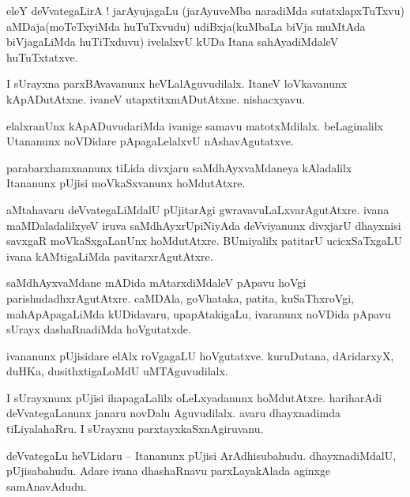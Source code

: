 \documentclass{article}
\begin{document}
\begin{mng}%
eleY deVvategaLirA ! jarAyujagaLu (jarAyuveMba naradiMda sutatxlapxTuTxvu) aMDaja(moTeTxyiMda 
huTuTxvudu) udiBxja(kuMbaLa biVja muMtAda biVjagaLiMda huTiTxduvu) ivelalxvU kUDa Itana 
sahAyadiMdaleV huTuTxtatxve.
\end{mng}

\begin{mng}%
I sUrayxna parxBAvavanunx heVLalAguvudilalx. ItaneV loVkavanunx kApADutAtxne. ivaneV 
utapxtitxmADutAtxne. nishacxyavu.
\end{mng}

\begin{mng}%
elalxranUnx kApADuvudariMda ivanige samavu matotxMdilalx. beLaginalilx Utananunx noVDidare 
pApagaLelalxvU nAshavAgutatxve.
\end{mng}

\begin{mng}%
parabarxhamxnanunx tiLida divxjaru saMdhAyxvaMdaneya kAladalilx Itananunx pUjisi moVkaSxvanunx 
hoMdutAtxre.
\end{mng}

\begin{mng}%
aMtahavaru deVvategaLiMdalU pUjitarAgi gwravavuLaLxvarAgutAtxre. ivana maMDaladalilxyeV iruva 
saMdhAyxrUpiNiyAda deVviyanunx divxjarU dhayxnisi savxgaR moVkaSxgaLanUnx hoMdutAtxre. BUmiyalilx 
patitarU ucicxSaTxgaLU ivana kAMtigaLiMda pavitarxrAgutAtxre.
\end{mng}

\begin{mng}%
saMdhAyxvaMdane mADida mAtarxdiMdaleV pApavu hoVgi parishudadhxrAgutAtxre. caMDAla, goVhataka, 
patita, kuSaThxroVgi, mahApApagaLiMda kUDidavaru, upapAtakigaLu, ivaranunx noVDida pApavu sUrayx 
dashaRnadiMda hoVgutatxde.
\end{mng}

\begin{mng}%
ivananunx pUjisidare elAlx roVgagaLU hoVgutatxve. kuruDutana, dAridarxyX, duHKa, dusithxtigaLoMdU 
uMTAguvudilalx.
\end{mng}

\begin{mng}%
I sUrayxnunx pUjisi ihapagaLalilx oLeLxyadanunx hoMdutAtxre. hariharAdi deVvategaLanunx janaru 
novDalu Aguvudilalx. avaru dhayxnadimda tiLiyalahaRru. I sUrayxnu parxtayxkaSxnAgiruvanu.
\end{mng}

\begin{mng}%
deVvategaLu heVLidaru -- Itananunx pUjisi ArAdhisubahudu. dhayxnadiMdalU, pUjisabahudu. Adare 
ivana dhashaRnavu parxLayakAlada aginxge samAnavAdudu.
\end{mng}
\end{document}
